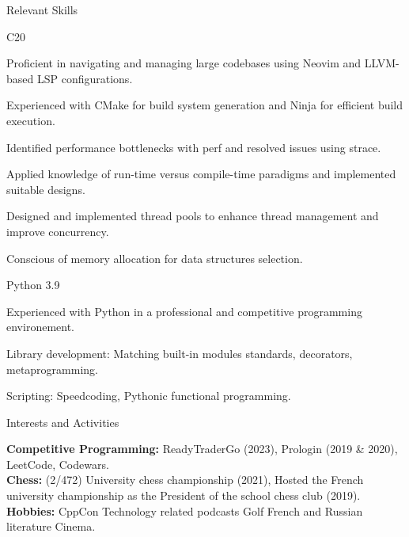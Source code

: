 \documentclass[
	a4paper, %
	10pt, %
]{resume} %
\def\CC{{C\nolinebreak[4]\hspace{-.05em}\raisebox{.4ex}{\tiny\bf ++}}}
\begin{document}
\begin{rSection}{Relevant Skills}
	\begin{rSubsection}{\CC20}{}{}{}
    \item Proficient in navigating and managing large codebases using Neovim and LLVM-based LSP configurations.
    \item Experienced with CMake for build system generation and Ninja for efficient build execution.
    \item Identified performance bottlenecks with perf and resolved issues using strace.
    \item Applied knowledge of run-time versus compile-time paradigms and implemented suitable designs.
    \item Designed and implemented thread pools to enhance thread management and improve concurrency.
    \item Conscious of memory allocation for data structures selection.
	\end{rSubsection}
  \begin{rSubsection}{Python 3.9}{}{}{}
    \item Experienced with Python in a professional and competitive programming environement.
    \item Library development: Matching built-in modules standards, decorators, metaprogramming.
    \item Scripting: Speedcoding, Pythonic functional programming.
  \end{rSubsection}
\end{rSection}


\begin{rSection}{Interests and Activities}

	\textbf{Competitive Programming:} ReadyTraderGo (2023), Prologin (2019 \& 2020), LeetCode, Codewars. \\
	\textbf{Chess:} (2/472) University chess championship (2021), Hosted the French university championship as the President of the school chess club (2019). \\
  \textbf{Hobbies:} CppCon  Technology related podcasts  Golf  French and Russian literature  Cinema.
\end{rSection}
\end{document}
